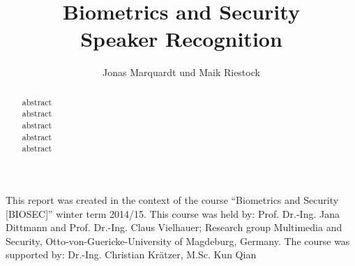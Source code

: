 \documentclass{acmtog}
\begin{document}
\title{Biometrics and Security\\ Speaker Recognition} 

\author{Jonas Marquardt {\upshape und} Maik Riestock
}




\maketitle

\begin{bottomstuff}
This report was created in the context of the course “Biometrics and Security [BIOSEC]” winter term 2014/15.
This course was held by: Prof. Dr.-Ing. Jana Dittmann and Prof. Dr.-Ing. Claus Vielhauer; Research group Multimedia and Security, Otto-von-Guericke-University of Magdeburg, Germany.
The course was supported by: Dr.-Ing. Christian Krätzer, M.Sc. Kun Qian
\end{bottomstuff}


\begin{abstract}
abstract\\
abstract\\
abstract\\
abstract\\
abstract\\

\end{abstract}




\listoftables

\newpage
\appendix


\end{document}
